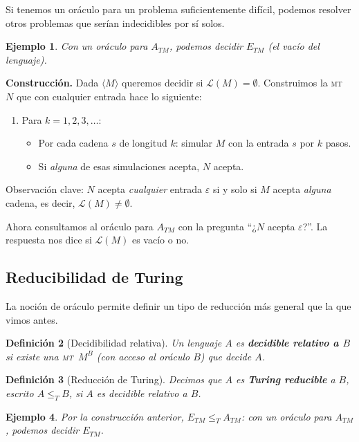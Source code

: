 \documentclass[11pt,a4paper]{article}
\theoremstyle{definicion}
\newtheorem{definicion}{Definición}[section]
\newtheorem{ejemplo}[definicion]{Ejemplo}
\newcommand{\MT}{\textsc{mt}}
\newcommand{\enc}[1]{\langle #1 \rangle}
\newcommand{\Lang}{\mathcal{L}}
\begin{document}
Si tenemos un oráculo para un problema suficientemente difícil, podemos resolver otros problemas que serían indecidibles por sí solos.

\begin{ejemplo}
Con un oráculo para $A_{TM}$, podemos decidir $E_{TM}$ (el vacío del lenguaje).
\end{ejemplo}

\textbf{Construcción.} Dada $\enc{M}$ queremos decidir si $\Lang(M) = \emptyset$. Construimos la \MT\ $N$ que con cualquier entrada hace lo siguiente:
\begin{enumerate}
    \item Para $k = 1, 2, 3, \dots$:
    \begin{itemize}
        \item Por cada cadena $s$ de longitud $k$: simular $M$ con la entrada $s$ por $k$ pasos.
        \item Si \emph{alguna} de esas simulaciones acepta, $N$ acepta.
    \end{itemize}
\end{enumerate}

Observación clave: $N$ acepta \emph{cualquier} entrada $\varepsilon$ si y solo si $M$ acepta \emph{alguna} cadena, es decir, $\Lang(M) \neq \emptyset$.

Ahora consultamos al oráculo para $A_{TM}$ con la pregunta ``¿$N$ acepta $\varepsilon$?''. La respuesta nos dice si $\Lang(M)$ es vacío o no.

\subsection{Reducibilidad de Turing}

La noción de oráculo permite definir un tipo de reducción más general que la que vimos antes.

\begin{definicion}[Decidibilidad relativa]
Un lenguaje $A$ es \textbf{decidible relativo a $B$} si existe una \MT\ $M^B$ (con acceso al oráculo $B$) que decide $A$.
\end{definicion}

\begin{definicion}[Reducción de Turing]
Decimos que $A$ es \textbf{Turing reducible} a $B$, escrito $A \leq_T B$, si $A$ es decidible relativo a $B$.
\end{definicion}

\begin{ejemplo}
Por la construcción anterior, $E_{TM} \leq_T A_{TM}$: con un oráculo para $A_{TM}$, podemos decidir $E_{TM}$.
\end{ejemplo}
\end{document}
